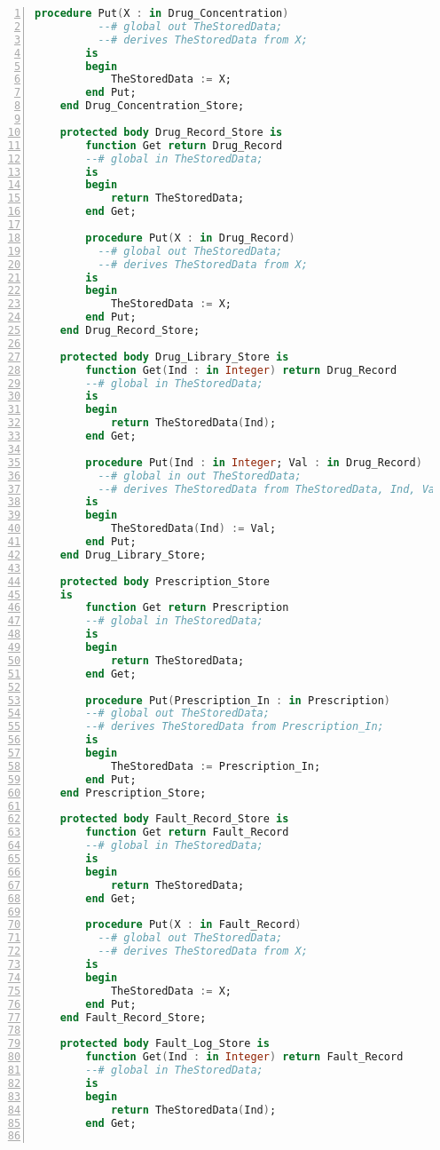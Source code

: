 \begin{lstlisting}[language=ada, gobble=0, numbers=left, caption={\lstinline{Pca_Types} package}]
        procedure Put(X : in Drug_Concentration)
          --# global out TheStoredData;
          --# derives TheStoredData from X;
        is
        begin
            TheStoredData := X;
        end Put;
    end Drug_Concentration_Store;

    protected body Drug_Record_Store is
        function Get return Drug_Record
        --# global in TheStoredData;
        is
        begin
            return TheStoredData;
        end Get;

        procedure Put(X : in Drug_Record)
          --# global out TheStoredData;
          --# derives TheStoredData from X;
        is
        begin
            TheStoredData := X;
        end Put;
    end Drug_Record_Store;

    protected body Drug_Library_Store is
        function Get(Ind : in Integer) return Drug_Record
        --# global in TheStoredData;
        is
        begin
            return TheStoredData(Ind);
        end Get;

        procedure Put(Ind : in Integer; Val : in Drug_Record)
          --# global in out TheStoredData;
          --# derives TheStoredData from TheStoredData, Ind, Val;
        is
        begin
            TheStoredData(Ind) := Val;
        end Put;
    end Drug_Library_Store;

    protected body Prescription_Store
    is
        function Get return Prescription
        --# global in TheStoredData;
        is
        begin
            return TheStoredData;
        end Get;

        procedure Put(Prescription_In : in Prescription)
        --# global out TheStoredData;
        --# derives TheStoredData from Prescription_In;
        is
        begin
            TheStoredData := Prescription_In;
        end Put;
    end Prescription_Store;

    protected body Fault_Record_Store is
        function Get return Fault_Record
        --# global in TheStoredData;
        is
        begin
            return TheStoredData;
        end Get;

        procedure Put(X : in Fault_Record)
          --# global out TheStoredData;
          --# derives TheStoredData from X;
        is
        begin
            TheStoredData := X;
        end Put;
    end Fault_Record_Store;

    protected body Fault_Log_Store is
        function Get(Ind : in Integer) return Fault_Record
        --# global in TheStoredData;
        is
        begin
            return TheStoredData(Ind);
        end Get;


\end{lstlisting}
